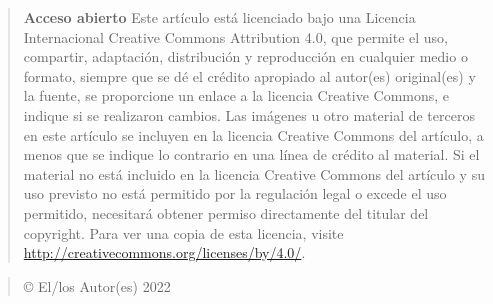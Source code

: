 \documentclass[
]{article}
\begin{document}
\begin{quote}
\textbf{Acceso abierto} Este artículo está licenciado bajo una Licencia
Internacional Creative Commons Attribution 4.0, que permite el uso,
compartir, adaptación, distribución y reproducción en cualquier medio o
formato, siempre que se dé el crédito apropiado al autor(es)
original(es) y la fuente, se proporcione un enlace a la licencia
Creative Commons, e indique si se realizaron cambios. Las imágenes u
otro material de terceros en este artículo se incluyen en la licencia
Creative Commons del artículo, a menos que se indique lo contrario en
una línea de crédito al material. Si el material no está incluido en la
licencia Creative Commons del artículo y su uso previsto no está
permitido por la regulación legal o excede el uso permitido, necesitará
obtener permiso directamente del titular del copyright. Para ver una
copia de esta licencia, visite
\url{http://creativecommons.org/licenses/by/4.0/}.
\end{quote}

\begin{quote}
© El/los Autor(es) 2022
\end{quote}
\end{document}
